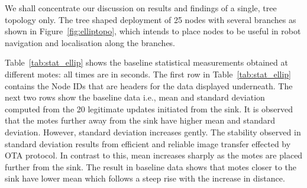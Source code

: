 \documentclass[conference,manuscript]{IEEEtran}
\begin{document}
We shall concentrate our discussion on results and findings of a single, tree topology only.
The tree shaped deployment of 25 nodes with several branches as shown in Figure~\ref{fig:elliptopo}, which intends to
place nodes to
be useful in robot navigation and localisation along the branches.

Table~\ref{tab:stat_ellip} shows the baseline statistical measurements obtained at different motes: all times are in seconds.
The first row in Table~\ref{tab:stat_ellip} contains the Node IDs that are headers for the data displayed underneath.
The next two rows show the baseline data i.e., mean and standard deviation computed from the 20 legitimate updates initiated from the sink.
It is observed that the motes further away from the sink have higher mean and standard deviation.  
However, standard deviation increases gently.
The stability observed in standard deviation results from efficient and reliable image transfer effected by OTA protocol.
In contrast to this, mean increases sharply as the motes are placed further from the sink.
The result in baseline data shows that motes closer to the sink have lower mean which follows a steep rise with the increase in distance.
\end{document}

